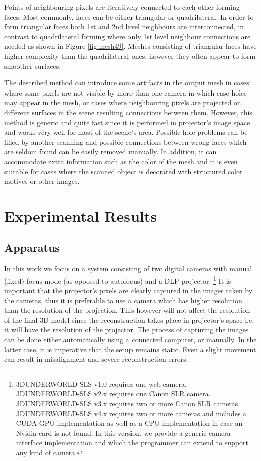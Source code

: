 \documentclass[final,12pt,3p]{elsarticle}
\begin{document}
Points of neighbouring pixels are iteratively connected to each other forming faces. Most commonly, faces can be either triangular or quadrilateral. In order to form triangular faces both 1st and 2nd level neighbours are interconnected, in contrast to quadrilateral forming where only 1st level neighbour connections are needed as shown in Figure \ref{fig:mesh49}. Meshes consisting of triangular faces have higher complexity than the quadrilateral ones, however they often appear to form smoother surfaces. 

The described method can introduce some artifacts in the output mesh in cases where some pixels are not visible by more than one camera in which case holes may appear in the mesh, or cases where neighbouring pixels are projected on different surfaces in the scene resulting connections between them. However, this method is generic and quite fast since it is performed in projector's image space and works very well for most of the scene's area. Possible hole problems can be filled by another scanning and possible connections between wrong faces which are seldom found can be easily removed manually. In addition, it can accommodate extra information such as the color of the mesh and it is even suitable for cases where the scanned object is decorated with structured color motives or other images.

\section{Experimental Results}
\label{sec:results}

\subsection{Apparatus}
\label{subsec:apparatus}
In this work we focus on a system consisting of two digital cameras with manual (fixed) focus mode (as opposed to autofocus) and a DLP projector. \footnote{3DUNDERWORLD-SLS v1.0 requires one web camera. \\ 3DUNDERWORLD-SLS v2.x requires one Canon SLR camera.\\3DUNDERWORLD-SLS v3.x requires two or more Canon SLR cameras.\\3DUNDERWORLD-SLS v4.x requires two or more cameras and includes a CUDA GPU implementation as well as a CPU implementation in case an Nvidia card is not found. In this version, we provide a generic camera interface implementation and which the programmer can extend to support any kind of camera.} It is important that the projector's pixels are clearly captured in the images taken by the cameras, thus it is preferable to use a camera which has higher resolution than the resolution of the projection. This however will not affect the resolution of the final 3D model since the reconstruction takes place in projector's space i.e. it will have the resolution of the projector. The process of capturing the images can be done either automatically using a connected computer, or manually. In the latter case, it is imperative that the setup remains static. Even a slight movement can result in misalignment and severe reconstruction errors.
\end{document}
